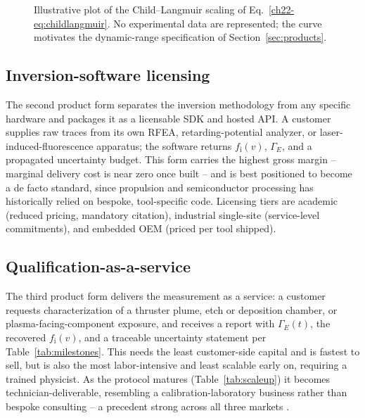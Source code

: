\begin{figure}[htbp]
\centering
{}
\caption{Illustrative plot of the Child--Langmuir scaling of Eq.~\eqref{ch22-eq:childlangmuir}. No experimental data are represented; the curve motivates the dynamic-range specification of Section~\ref{sec:products}.}
\label{fig:childlangmuir}
\end{figure}

\subsection{Inversion-software licensing}

The second product form separates the inversion methodology from any specific hardware and packages it as a licensable SDK and hosted API. A customer supplies raw traces from its own RFEA, retarding-potential analyzer, or laser-induced-fluorescence apparatus; the software returns $f_{\mathrm{i}}(v)$, $\Gamma_{E}$, and a propagated uncertainty budget. This form carries the highest gross margin -- marginal delivery cost is near zero once built -- and is best positioned to become a de facto standard, since propulsion \cite{ref0506} and semiconductor \cite{ref0548} processing has historically relied on bespoke, tool-specific code. Licensing tiers are academic (reduced pricing, mandatory citation), industrial single-site (service-level commitments), and embedded OEM (priced per tool shipped).

\subsection{Qualification-as-a-service}

The third product form delivers the measurement as a service: a customer requests characterization of a thruster plume, etch or deposition chamber, or plasma-facing-component exposure, and receives a report with $\Gamma_{E}(t)$, the recovered $f_{\mathrm{i}}(v)$, and a traceable uncertainty statement per Table~\ref{tab:milestones}. This needs the least customer-side capital and is fastest to sell, but is also the most labor-intensive and least scalable early on, requiring a trained physicist. As the protocol matures (Table~\ref{tab:scaleup}) it becomes technician-deliverable, resembling a calibration-laboratory business rather than bespoke consulting -- a precedent strong across all three markets \cite{ref0490,ref0506,ref0553,ref0556,ref0586,ref0588}.

